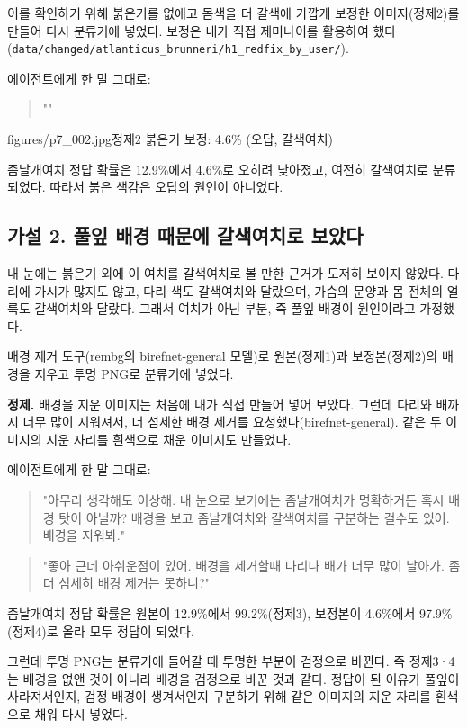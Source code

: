 \documentclass[11pt]{article}
\begin{document}
이를 확인하기 위해 붉은기를 없애고 몸색을 더 갈색에 가깝게 보정한 이미지(정제2)를 만들어 다시 분류기에 넣었다. 보정은 내가 직접 제미나이를 활용하여 했다(\texttt{data/changed/atlanticus\_brunneri/h1\_redfix\_by\_user/}).

에이전트에게 한 말 그대로:
\begin{quote}
""
\end{quote}

           {figures/p7_002.jpg}{정제2 붉은기 보정: 4.6\% (오답, 갈색여치)}

좀날개여치 정답 확률은 12.9\%에서 4.6\%로 오히려 낮아졌고, 여전히 갈색여치로 분류되었다. 따라서 붉은 색감은 오답의 원인이 아니었다.

\subsection*{가설 2. 풀잎 배경 때문에 갈색여치로 보았다}

내 눈에는 붉은기 외에 이 여치를 갈색여치로 볼 만한 근거가 도저히 보이지 않았다. 다리에 가시가 많지도 않고, 다리 색도 갈색여치와 달랐으며, 가슴의 문양과 몸 전체의 얼룩도 갈색여치와 달랐다. 그래서 여치가 아닌 부분, 즉 풀잎 배경이 원인이라고 가정했다.

배경 제거 도구(rembg의 birefnet-general 모델)로 원본(정제1)과 보정본(정제2)의 배경을 지우고 투명 PNG로 분류기에 넣었다.

\textbf{정제.} 배경을 지운 이미지는 처음에 내가 직접 만들어 넣어 보았다. 그런데 다리와 배까지 너무 많이 지워져서, 더 섬세한 배경 제거를 요청했다(birefnet-general). 같은 두 이미지의 지운 자리를 흰색으로 채운 이미지도 만들었다.

에이전트에게 한 말 그대로:
\begin{quote}
"아무리 생각해도 이상해. 내 눈으로 보기에는 좀날개여치가 명확하거든 혹시 배경 탓이 아닐까? 배경을 보고 좀날개여치와 갈색여치를 구분하는 걸수도 있어. 배경을 지워봐."
\end{quote}
\begin{quote}
"좋아 근데 아쉬운점이 있어. 배경을 제거할때 다리나 배가 너무 많이 날아가. 좀 더 섬세히 배경 제거는 못하니?"
\end{quote}

좀날개여치 정답 확률은 원본이 12.9\%에서 99.2\%(정제3), 보정본이 4.6\%에서 97.9\%(정제4)로 올라 모두 정답이 되었다.

그런데 투명 PNG는 분류기에 들어갈 때 투명한 부분이 검정으로 바뀐다. 즉 정제3·4는 배경을 없앤 것이 아니라 배경을 검정으로 바꾼 것과 같다. 정답이 된 이유가 풀잎이 사라져서인지, 검정 배경이 생겨서인지 구분하기 위해 같은 이미지의 지운 자리를 흰색으로 채워 다시 넣었다.
\end{document}
